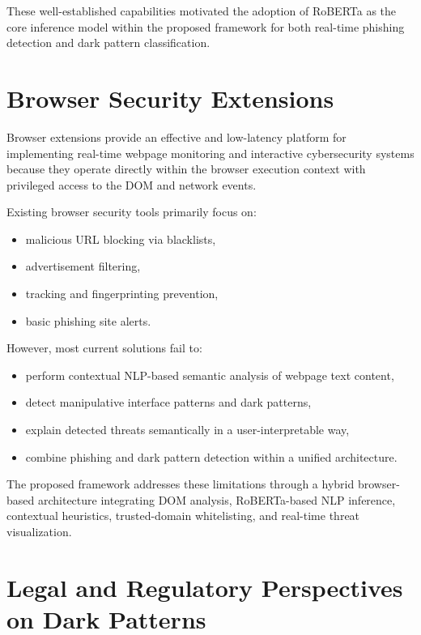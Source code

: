 These well-established capabilities motivated the adoption of RoBERTa as the core inference model within the proposed framework for both real-time phishing detection and dark pattern classification.


\section{Browser Security Extensions}

Browser extensions provide an effective and low-latency platform for implementing real-time webpage monitoring and interactive cybersecurity systems because they operate directly within the browser execution context with privileged access to the DOM and network events.

Existing browser security tools primarily focus on:
\begin{itemize}
\item malicious URL blocking via blacklists,
\item advertisement filtering,
\item tracking and fingerprinting prevention,
\item basic phishing site alerts.
\end{itemize}

However, most current solutions fail to:
\begin{itemize}
\item perform contextual NLP-based semantic analysis of webpage text content,
\item detect manipulative interface patterns and dark patterns,
\item explain detected threats semantically in a user-interpretable way,
\item combine phishing and dark pattern detection within a unified architecture.
\end{itemize}

The proposed framework addresses these limitations through a hybrid browser-based architecture integrating DOM analysis, RoBERTa-based NLP inference, contextual heuristics, trusted-domain whitelisting, and real-time threat visualization.


\section{Legal and Regulatory Perspectives on Dark Patterns}

